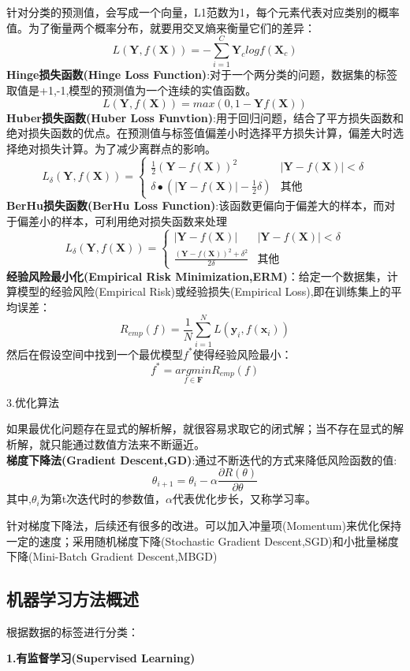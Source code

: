 \documentclass[openbib]{article}
\begin{document}
针对分类的预测值，会写成一个向量，L1范数为1，每个元素代表对应类别的概率值。为了衡量两个概率分布，就要用交叉熵来衡量它们的差异：
$$L(\textbf{Y},f(\textbf{X}))=-\sum_{i=1}^{C}\textbf{Y}_clogf(\textbf{X}_c)$$
\textbf{Hinge损失函数(Hinge Loss Function)}:对于一个两分类的问题，数据集的标签取值是{+1,-1},模型的预测值为一个连续的实值函数。
$$L(\textbf{Y},f(\textbf{X}))=max(0,1-\textbf{Y}f(\textbf{X}))$$
\textbf{Huber损失函数(Huber Loss Funvtion)}:用于回归问题，结合了平方损失函数和绝对损失函数的优点。在预测值与标签值偏差小时选择平方损失计算，偏差大时选择绝对损失计算。为了减少离群点的影响。
$$L_{\delta}(\textbf{Y},f(\textbf{X}))=\left\{ \begin{array}{cl}
	\frac{1}{2}(\textbf{Y}-f(\textbf{X}))^2 & |\textbf{Y}-f(\textbf{X})|<\delta \\
	\delta\bullet(|\textbf{Y}-f(\textbf{X})|-\frac{1}{2}\delta) & \text{其他}
\end{array} \right.$$
\textbf{BerHu损失函数(BerHu Loss Function)}:该函数更偏向于偏差大的样本，而对于偏差小的样本，可利用绝对损失函数来处理
$$L_{\delta}(\textbf{Y},f(\textbf{X}))=\left\{ \begin{array}{cl}
	|\textbf{Y}-f(\textbf{X})|& |\textbf{Y}-f(\textbf{X})|<\delta \\
	\frac{(\textbf{Y}-f(\textbf{X}))^2+\delta^2}{2\delta} & \text{其他}
\end{array} \right.$$
\textbf{经验风险最小化(Empirical Risk Minimization,ERM)}：给定一个数据集，计算模型的经验风险(Empirical Risk)或经验损失(Empirical Loss),即在训练集上的平均误差：
$$R_{emp}(f)=\frac{1}{N}\sum_{i=1}^{N}L(\textbf{y}_i,f(\textbf{x}_i))$$
然后在假设空间中找到一个最优模型$f^*$使得经验风险最小：
$$f^*=\underset{f\in \textbf{F}}{argmin}R_{emp}(f)$$

3.优化算法

如果最优化问题存在显式的解析解，就很容易求取它的闭式解；当不存在显式的解析解，就只能通过数值方法来不断逼近。
\\\textbf{梯度下降法(Gradient Descent,GD)}:通过不断迭代的方式来降低风险函数的值:$$\theta_{i+1}=\theta_i-\alpha \frac{\partial R(\theta)}{\partial \theta}$$
其中,$\theta_i$为第t次迭代时的参数值，$\alpha$代表优化步长，又称学习率。

针对梯度下降法，后续还有很多的改进。可以加入冲量项(Momentum)来优化保持一定的速度；采用随机梯度下降(Stochastic Gradient Descent,SGD)和小批量梯度下降(Mini-Batch Gradient Descent,MBGD)
\subsection{机器学习方法概述}
根据数据的标签进行分类：
\begin{center}
	\textbf{1.有监督学习(Supervised Learning)}
\end{center}
\end{document}
